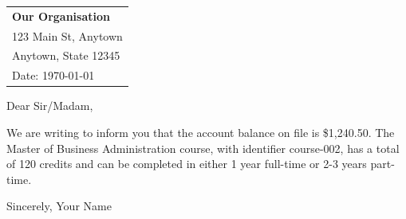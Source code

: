 \documentclass{article}
\begin{document}
\begin{tabular}{@{}l@{}}
\textbf{Our Organisation} \\
123 Main St, Anytown \\
Anytown, State 12345 \\
Date: \today
\end{tabular}

Dear Sir/Madam,

We are writing to inform you that the account balance on file is \$1,240.50.
The Master of Business Administration course, with identifier course-002, has a total of 120 credits and can be completed in either 1 year full-time or 2-3 years part-time.

Sincerely,
Your Name
\end{document}
